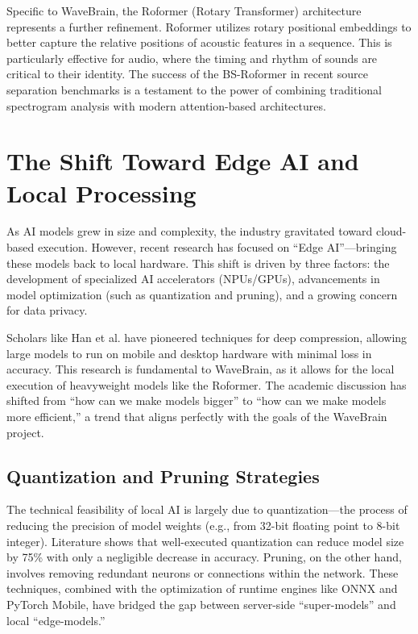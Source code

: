 \documentclass[12pt,a4paper]{article}
\begin{document}
Specific to WaveBrain, the Roformer (Rotary Transformer) architecture represents a further refinement. Roformer utilizes rotary positional embeddings to better capture the relative positions of acoustic features in a sequence. This is particularly effective for audio, where the timing and rhythm of sounds are critical to their identity. The success of the BS-Roformer in recent source separation benchmarks is a testament to the power of combining traditional spectrogram analysis with modern attention-based architectures.

\section{The Shift Toward Edge AI and Local Processing}
As AI models grew in size and complexity, the industry gravitated toward cloud-based execution. However, recent research has focused on ``Edge AI''---bringing these models back to local hardware. This shift is driven by three factors: the development of specialized AI accelerators (NPUs/GPUs), advancements in model optimization (such as quantization and pruning), and a growing concern for data privacy.

Scholars like Han et al. have pioneered techniques for deep compression, allowing large models to run on mobile and desktop hardware with minimal loss in accuracy. This research is fundamental to WaveBrain, as it allows for the local execution of heavyweight models like the Roformer. The academic discussion has shifted from ``how can we make models bigger'' to ``how can we make models more efficient,'' a trend that aligns perfectly with the goals of the WaveBrain project.

\subsection{Quantization and Pruning Strategies}
The technical feasibility of local AI is largely due to quantization---the process of reducing the precision of model weights (e.g., from 32-bit floating point to 8-bit integer). Literature shows that well-executed quantization can reduce model size by 75\% with only a negligible decrease in accuracy. Pruning, on the other hand, involves removing redundant neurons or connections within the network. These techniques, combined with the optimization of runtime engines like ONNX and PyTorch Mobile, have bridged the gap between server-side ``super-models'' and local ``edge-models.''
\end{document}
